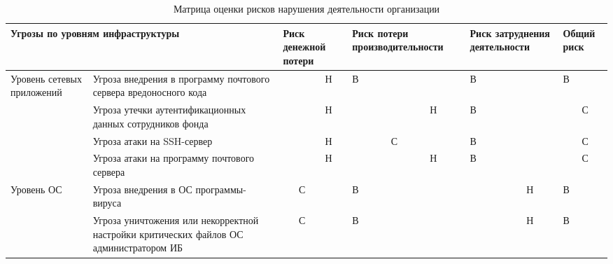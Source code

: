 \begin{sidewaystable}[h]
  \begin{longtable}{|p{2.7cm}|p{6cm}|p{0.7cm}|p{0.7cm}|p{0.7cm}|p{0.7cm}|p{0.7cm}|p{0.7cm}|p{0.7cm}|p{0.7cm}|p{0.7cm}|p{0.7cm}|p{0.7cm}|p{0.7cm}|}
    \caption{Матрица оценки рисков нарушения деятельности организации}
    \label{tab:matr_ocenki} \\
    \hline
    \multicolumn{2}{|p{8.7cm}|}{Угрозы по уровням инфраструктуры} &
    \multicolumn{3}{p{2.1cm}|}{Риск денежной потери} &
    \multicolumn{3}{p{2.1cm}|}{Риск потери производительности} &
    \multicolumn{3}{p{2.1cm}|}{Риск затруднения деятельности} &
    \multicolumn{3}{p{2.1cm}|}{Общий риск} \\\hline
    \multirow{4}{3cm}{Уровень сетевых прило\-жений} &
    Угроза внедрения в программу почтового сервера вредоносного кода
    &&&Н&В&&&В&&&В&&\\\cline{2-14}
    & Угроза утечки аутентификационных данных сотрудников фонда
    &&&Н&&&Н&В&&&&С&\\\cline{2-14}
    & Угроза атаки на SSH-сервер
    &&&Н&&С&&В&&&&С&\\\cline{2-14}
    & Угроза атаки на программу почтового сервера
    &&&Н&&&Н&В&&&&С&\\\hline
    \multirow{4}{3cm}{Уровень ОС} &
    Угроза внедрения в ОС программы-вируса
    &&С&&В&&&&&Н&В&&\\\cline{2-14}
    & Угроза уничтожения или некорректной настройки критических файлов
    ОС администратором ИБ
    &&С&&В&&&&&Н&В&&\\\hline
  \end{longtable}
\end{sidewaystable}

